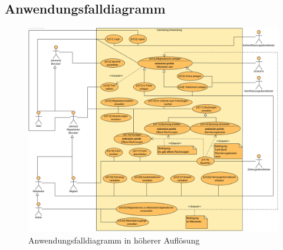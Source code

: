 \subsection{Anwendungsfalldiagramm}

\begin{figure} [H]
    \label{fig:anwendungsfalldiagramm_anhang}
    \begin{minipage}[c][0.95\textheight]{\textwidth}
        \centering
        \includegraphics[width = \textwidth]{pictures/anwendungsfalldiagramm}
        \caption{Anwendungsfalldiagramm in höherer Auflösung}
    \end{minipage}
\end{figure}
